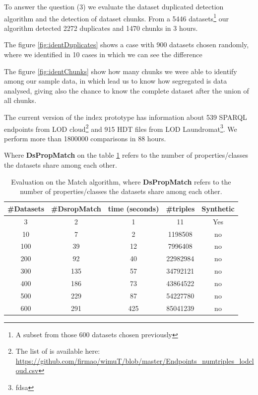 
To answer the question (3) we evaluate the dataset duplicated detection algorithm and the detection of dataset chunks.
From a 5446 datasets\footnote{A subset from those 600 datasets chosen previously} our algorithm detected 2272 duplicates and 1470 chunks in 3 hours.

The figure \ref{fig:identDuplicates} shows a case with 900 datasets chosen randomly, where we identified in 10 cases in which we can see the difference 

The figure \ref{fig:identChunks} show how many chunks we were able to identify among our sample data, in which lead us to know how segregated is data analysed, giving also the chance to know the complete dataset after the union of all chunks.

The current version of the index prototype has information about 539 SPARQL endpoints from LOD cloud\footnote{The list of is available here: \url{https://github.com/firmao/wimuT/blob/master/Endpoints_numtriples_lodcloud.csv}} and 915 HDT files from LOD Laundromat\footnote{fdsa}. We perform more than \num{1800000} comparisons in 88 hours.

Where \textbf{DsPropMatch} on the table \ref{tab:match} refers to the number of properties/classes the datasets share among each other.

\begin{table}[htb]
    \centering
    \begin{tabular}{ccccc} \hline
    \textbf{\#Datasets} & \textbf{\#DsropMatch} & \textbf{time (seconds)} & \textbf{\#triples} & \textbf{Synthetic} \\ \hline
    3 & 2 & 1 & 11 & Yes \\
    10 & 7 & 2 & 1198508 & no \\
    100 & 39 & 12 & 7996408 & no \\
    200 & 92 & 40 & 22982984 & no \\
    300 & 135 & 57 & 34792121 & no \\
    400 & 186 & 73 & 43864522 & no \\
    500 & 229 & 87 & 54227780 & no \\
    600 & 291 & 425 & 85041239 & no \\ \hline
    \end{tabular}
    \caption{Evaluation on the Match algorithm, where \textbf{DsPropMatch} refers to the number of properties/classes the datasets share among each other.}
    \label{tab:match}
\end{table}

